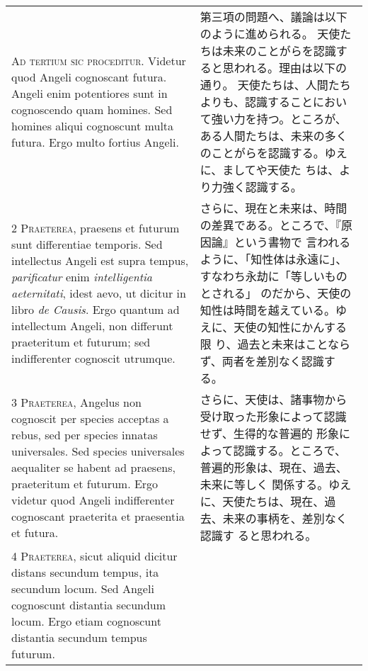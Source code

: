 \documentclass[10pt]{jsarticle} %
\begin{document}
\begin{longtable}{p{21em}p{21em}}

{\huge A}{\scshape d tertium sic proceditur}. Videtur quod
Angeli cognoscant futura. Angeli enim potentiores sunt in cognoscendo
quam homines. Sed homines aliqui cognoscunt multa futura. Ergo multo
fortius Angeli.


&

 第三項の問題へ、議論は以下のように進められる。
 天使たちは未来のことがらを認識すると思われる。理由は以下の通り。
 天使たちは、人間たちよりも、認識することにおいて強い力を持つ。ところが、
 ある人間たちは、未来の多くのことがらを認識する。ゆえに、ましてや天使た
 ちは、より力強く認識する。
 

\\


{\scshape 2 Praeterea}, praesens et futurum sunt
differentiae temporis. Sed intellectus Angeli est supra tempus,
{\itshape parificatur} enim {\itshape intelligentia aeternitati}, idest aevo, ut dicitur in
libro {\itshape de Causis}. Ergo quantum ad intellectum Angeli, non differunt
praeteritum et futurum; sed indifferenter cognoscit utrumque.


&

さらに、現在と未来は、時間の差異である。ところで、『原因論』という書物で
 言われるように、「知性体は永遠に」、すなわち永劫に「等しいものとされる」
 のだから、天使の知性は時間を越えている。ゆえに、天使の知性にかんする限
 り、過去と未来はことならず、両者を差別なく認識する。
 

\\


{\scshape 3 Praeterea}, Angelus non cognoscit per
species acceptas a rebus, sed per species innatas universales. Sed
species universales aequaliter se habent ad praesens, praeteritum et
futurum. Ergo videtur quod Angeli indifferenter cognoscant praeterita et
praesentia et futura.


&

さらに、天使は、諸事物から受け取った形象によって認識せず、生得的な普遍的
 形象によって認識する。ところで、普遍的形象は、現在、過去、未来に等しく
 関係する。ゆえに、天使たちは、現在、過去、未来の事柄を、差別なく認識す
 ると思われる。
 

\\


{\scshape 4 Praeterea}, sicut aliquid dicitur distans
secundum tempus, ita secundum locum. Sed Angeli cognoscunt distantia
secundum locum. Ergo etiam cognoscunt distantia secundum tempus futurum.



\end{longtable}
\end{document}
